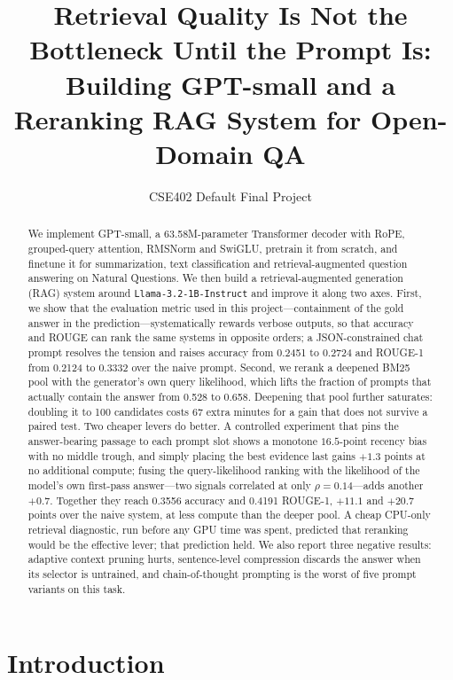 \documentclass[11pt]{article}
\title{Retrieval Quality Is Not the Bottleneck Until the Prompt Is:\\
       Building GPT-small and a Reranking RAG System for Open-Domain QA}
\author{CSE402 Default Final Project}
\begin{document}
\maketitle

\begin{abstract}
We implement GPT-small, a 63.58M-parameter Transformer decoder with RoPE, grouped-query
attention, RMSNorm and SwiGLU, pretrain it from scratch, and finetune it for summarization,
text classification and retrieval-augmented question answering on Natural Questions.
We then build a retrieval-augmented generation (RAG) system around
\texttt{Llama-3.2-1B-Instruct} and improve it along two axes. First, we show that the
evaluation metric used in this project---containment of the gold answer in the
prediction---systematically rewards verbose outputs, so that accuracy and ROUGE can rank the
same systems in opposite orders; a JSON-constrained chat prompt resolves the tension and
raises accuracy from 0.2451 to 0.2724 and ROUGE-1 from 0.2124 to 0.3332 over the naive
prompt. Second, we rerank a deepened BM25 pool with the generator's own query likelihood,
which lifts the fraction of prompts that actually contain the answer from 0.528 to 0.658.
Deepening that pool further saturates: doubling it to 100 candidates costs 67 extra minutes
for a gain that does not survive a paired test. Two cheaper levers do better. A controlled
experiment that pins the answer-bearing passage to each prompt slot shows a monotone
$16.5$-point recency bias with no middle trough, and simply placing the best evidence last
gains $+1.3$ points at no additional compute; fusing the query-likelihood ranking with the
likelihood of the model's own first-pass answer---two signals correlated at only
$\rho{=}0.14$---adds another $+0.7$. Together they reach 0.3556 accuracy and 0.4191 ROUGE-1,
$+11.1$ and $+20.7$ points over the naive system, at less compute than the deeper pool.
A cheap CPU-only retrieval diagnostic, run before any GPU time
was spent, predicted that reranking would be the effective lever; that prediction held. We
also report three negative results: adaptive context pruning hurts, sentence-level compression
discards the answer when its selector is untrained, and chain-of-thought prompting is the
worst of five prompt variants on this task.
\end{abstract}

\section{Introduction}
\end{document}
